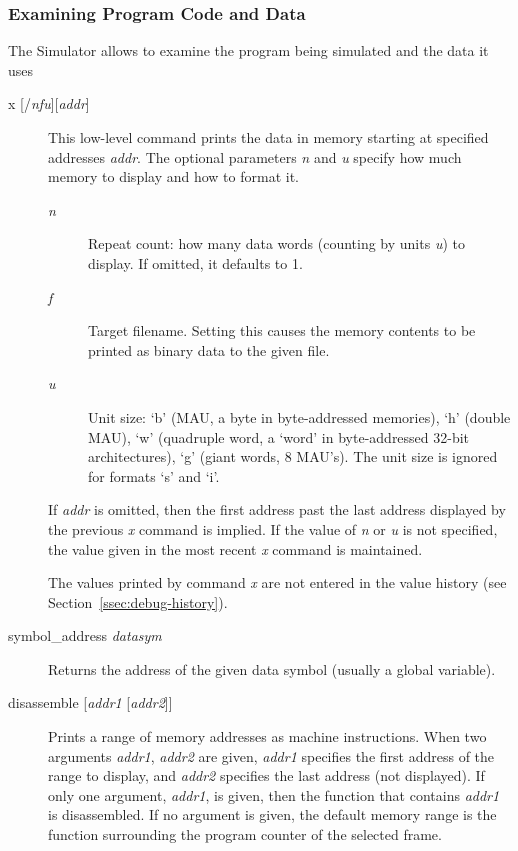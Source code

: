 \documentclass[twoside]{tceusermanual}
\begin{document}
\subsubsection{Examining Program Code and Data}
\label{ssec:debug-data}

The Simulator allows to examine the program being simulated and the data it
uses

\begin{description}
\item[x {[/\emph{nfu}][\emph{addr}]}] %
  This low-level command prints the data in memory starting at specified
  addresses \emph{addr}.  The optional parameters \emph{n} and
  \emph{u} specify how much memory to display and how to format it.
  \begin{description}
  \item[\emph{n}] %
    Repeat count: how many data words (counting by units \emph{u}) to
    display.  If omitted, it defaults to 1.
  \item[\emph{f}] %
    Target filename. Setting this causes the memory contents to be printed 
    as binary data to the given file.
  \item[\emph{u}] %
    Unit size: `b' (MAU, a byte in byte-addressed memories), `h' (double
    MAU), `w' (quadruple word, a `word' in byte-addressed 32-bit
    architectures), `g' (giant words, 8 MAU's).  The unit size is ignored
    for formats `s' and `i'.
  \end{description}

  If \emph{addr} is omitted, then the first address past the last address
  displayed by the previous \emph{x} command is implied.  If the value of
  \emph{n} or \emph{u} is not specified, the value given in the
  most recent \emph{x} command is maintained.

  The values printed by command \emph{x} are not entered in the value
  history (see Section~\ref{ssec:debug-history}).

\item[symbol\_address \emph{datasym} ] %

  Returns the address of the given data symbol (usually
  a global variable). 

\item[disassemble {[\emph{addr1} [\emph{addr2}]]}] %
  Prints a range of memory addresses as machine instructions.  When two
  arguments \emph{addr1}, \emph{addr2} are given, \emph{addr1} specifies the
  first address of the range to display, and \emph{addr2} specifies the last
  address (not displayed).  If only one argument, \emph{addr1}, is given,
  then the function that contains \emph{addr1} is disassembled.  If no
  argument is given, the default memory range is the function surrounding
  the program counter of the selected frame.

\end{description}
\end{document}
